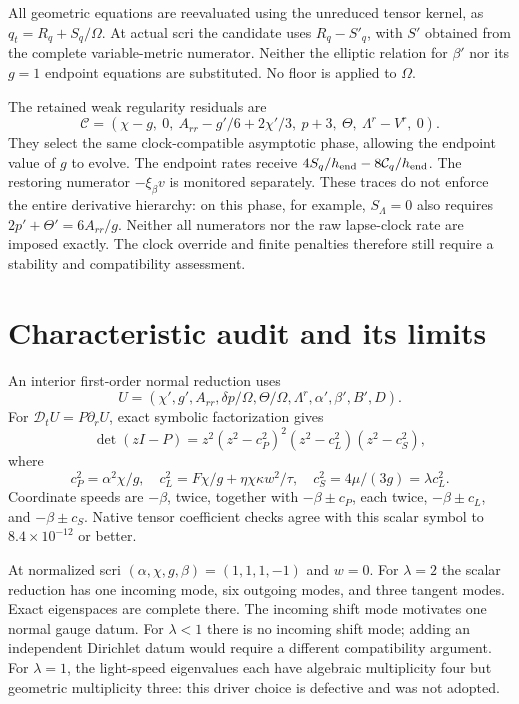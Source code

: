\documentclass[11pt]{article}
\newcommand{\dt}{\mathcal D_t}
\begin{document}
All geometric equations are reevaluated using the unreduced tensor kernel, as $q_t=R_q+S_q/\Omega$. At actual scri the candidate uses $R_q-S'_q$, with $S'$ obtained from the complete variable-metric numerator. Neither the elliptic relation for $\beta'$ nor its $g=1$ endpoint equations are substituted. No floor is applied to $\Omega$.

The retained weak regularity residuals are
\begin{equation}
 \mathcal C=\left(\chi-g,\ 0,\ A_{rr}-g'/6+2\chi'/3,\ p+3,\ \Theta,\ \Lambda^r-V^r,\ 0\right).
\end{equation}
They select the same clock-compatible asymptotic phase, allowing the endpoint value of $g$ to evolve. The endpoint rates receive $4S_q/h_{\rm end}-8\mathcal C_q/h_{\rm end}$. The restoring numerator $-\xi_\beta v$ is monitored separately. These traces do not enforce the entire derivative hierarchy: on this phase, for example, $S_\Lambda=0$ also requires $2p'+\Theta'=6A_{rr}/g$. Neither all numerators nor the raw lapse-clock rate are imposed exactly. The clock override and finite penalties therefore still require a stability and compatibility assessment.

\section{Characteristic audit and its limits}
An interior first-order normal reduction uses
\begin{equation}
 U=(\chi',g',A_{rr},\delta p/\Omega,\Theta/\Omega,
      \Lambda^r,\alpha',\beta',B',D).
\end{equation}
For $\dt U=P\partial_rU$, exact symbolic factorization gives
\begin{equation}
 \det(zI-P)=z^2(z^2-c_P^2)^2(z^2-c_L^2)(z^2-c_S^2),\label{eq:poly}
\end{equation}
where
\begin{equation}
 c_P^2=\alpha^2\chi/g,\quad
 c_L^2=F\chi/g+\eta\chi\kappa w^2/\tau,\quad
 c_S^2=4\mu/(3g)=\lambda c_L^2.
\end{equation}
Coordinate speeds are $-\beta$, twice, together with $-\beta\pm c_P$, each twice, $-\beta\pm c_L$, and $-\beta\pm c_S$. Native tensor coefficient checks agree with this scalar symbol to $8.4\times10^{-12}$ or better.

At normalized scri $(\alpha,\chi,g,\beta)=(1,1,1,-1)$ and $w=0$. For $\lambda=2$ the scalar reduction has one incoming mode, six outgoing modes, and three tangent modes. Exact eigenspaces are complete there. The incoming shift mode motivates one normal gauge datum. For $\lambda<1$ there is no incoming shift mode; adding an independent Dirichlet datum would require a different compatibility argument. For $\lambda=1$, the light-speed eigenvalues each have algebraic multiplicity four but geometric multiplicity three: this driver choice is defective and was not adopted.
\end{document}
